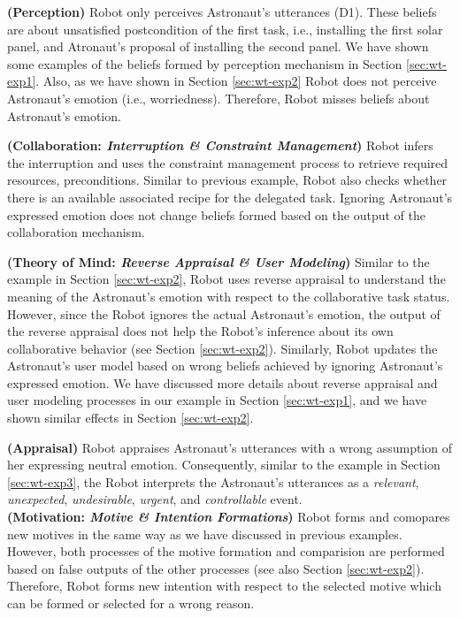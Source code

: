 \noindent\textbf{(Perception)} Robot only perceives Astronaut's utterances
(D1). These beliefs are about unsatisfied postcondition of the first task, i.e.,
installing the first solar panel, and Atronaut's proposal of installing the
second panel. We have shown some examples of the beliefs formed by perception
mechanism in Section \ref{sec:wt-exp1}. Also, as we have shown in Section
\ref{sec:wt-exp2} Robot does not perceive Astronaut's emotion (i.e.,
worriedness). Therefore, Robot misses beliefs about Astronaut's emotion.

\noindent\textbf{(Collaboration: \textit{Interruption \& Constraint
Management})} Robot infers the interruption and uses the constraint management
process to retrieve required resources, preconditions. Similar to previous
example, Robot also checks whether there is an available associated recipe for
the delegated task. Ignoring Astronaut's expressed emotion does not change
beliefs formed based on the output of the collaboration mechanism.

\noindent\textbf{(Theory of Mind: \textit{Reverse Appraisal \& User Modeling})}
Similar to the example in Section \ref{sec:wt-exp2}, Robot uses reverse
appraisal to understand the meaning of the Astronaut's emotion with respect to
the collaborative task status. However, since the Robot ignores the actual
Astronaut's emotion, the output of the reverse appraisal does not help the
Robot's inference about its own collaborative behavior (see Section
\ref{sec:wt-exp2}). Similarly, Robot updates the Astronaut's user model based on
wrong beliefs achieved by ignoring Astronaut's expressed emotion. We have
discussed more details about reverse appraisal and user modeling processes in
our example in Section \ref{sec:wt-exp1}, and we have shown similar effects
in Section \ref{sec:wt-exp2}.

\noindent\textbf{(Appraisal)} Robot appraises Astronaut's utterances with a
wrong assumption of her expressing neutral emotion. Consequently, similar to
the example in Section \ref{sec:wt-exp3}, the Robot interprets the Astronaut's
utterances as a \textit{relevant}, \textit{unexpected}, \textit{undesirable},
\textit{urgent}, and \textit{controllable} event.\\

\noindent\textbf{(Motivation: \textit{Motive \& Intention Formations})} Robot
forms and comopares new motives in the same way as we have discussed in previous
examples. However, both processes of the motive formation and comparision are
performed based on false outputs of the other processes (see also Section
\ref{sec:wt-exp2}). Therefore, Robot forms new intention with respect to the
selected motive which can be formed or selected for a wrong reason.

